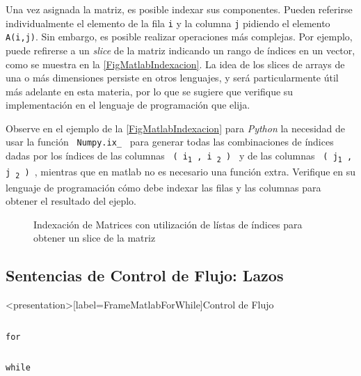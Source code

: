Una vez asignada la matriz, es posible indexar sus componentes. 
Pueden referirse individualmente el elemento de la fila \texttt{i} y la
columna \texttt{j} pidiendo el elemento \texttt{A(i,j)}. Sin 
embargo, es posible realizar operaciones más complejas. Por ejemplo,
puede refirerse a un \emph{slice} de la matriz indicando un rango 
de índices en un vector, como se muestra en la
\autoref{FigMatlabIndexacion}. La idea de los slices de arrays de una o 
más dimensiones persiste en otros lenguajes, y será particularmente
útil más adelante en esta materia, por lo que se sugiere que
verifique su implementación en el lenguaje de programación 
que elija. 

Observe en el ejemplo de la \autoref{FigMatlabIndexacion} para \emph{Python}
la necesidad de usar la función \texttt{ Numpy.ix\_ } para generar todas las 
combinaciones de índices dadas por los índices de las columnas 
\texttt{ ( i\textsubscript{1} , i \textsubscript{2} ) }
y de las columnas \texttt{ ( j\textsubscript{1} , j \textsubscript{2} ) }, 
mientras que en matlab no es necesario
una función extra. Verifique en su lenguaje de programación cómo debe indexar 
las filas y las columnas para obtener el resultado del ejeplo. 

\mode*

\begin{figure}
  \caption{ Indexación de Matrices con utilización de lístas de índices para
 obtener un slice de la matriz \label{FigMatlabIndexacion} }
\end{figure}

\mode*

\subsection{Sentencias de Control de Flujo: Lazos}

\begin{frame}<presentation>[label=FrameMatlabForWhile]{Control de Flujo}
\begin{columns}[T]
\hfill \large\texttt{for}

\begin{codeblock}

\end{codeblock}
\end{columns}

\begin{columns}[T]
\hfill \large\texttt{while}

\begin{codeblock}

\end{codeblock}

\end{columns}
\end{frame}

